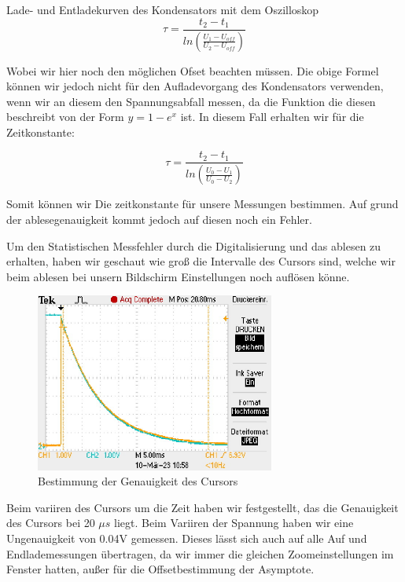 \documentclass[twoside]{protokoll}
\begin{document}
\begin{aufgabe}{Lade- und Entladekurven des Kondensators mit dem Oszilloskop}
\begin{equation}
	\tau = \frac{t_2 - t_1}{ln\left(\frac{U_1-U_{off}}{U_2-U_{off}}\right)}	
\end{equation}

Wobei wir hier noch den möglichen Ofset beachten müssen. Die obige Formel können wir jedoch nicht für den Aufladevorgang des Kondensators verwenden, wenn wir an diesem den Spannungsabfall messen, da die Funktion die diesen beschreibt von der Form $ y = 1 - e^x $ ist. 
In diesem Fall erhalten wir für die Zeitkonstante:
 
 \begin{equation}
 \tau = \frac{t_2 - t_1}{ln\left(\frac{U_0 - U_1}{U_0 - U_2}\right)}
\end{equation}

Somit können wir Die zeitkonstante für unsere Messungen bestimmen. Auf grund der ablesegenauigkeit kommt jedoch auf diesen noch ein Fehler. 

Um den Statistischen Messfehler durch die Digitalisierung und das ablesen zu erhalten, haben wir geschaut wie groß die Intervalle des Cursors sind, welche wir beim ablesen bei unsern Bildschirm Einstellungen noch auflösen könne.
 
\begin{figure}[H]
  \centering
    \includegraphics[width=0.7\textwidth]{Bilder_Osziloskop/osziloskop-test-cursor-genauigkeit.pdf}
    \caption{Bestimmung der Genauigkeit des Cursors}
  \centering
\end{figure}
Beim variiren des Cursors um die Zeit haben wir festgestellt, das die Genauigkeit des Cursors bei 20 $\mu s$ liegt.
Beim Variiren der Spannung haben wir eine Ungenauigkeit von 0.04V gemessen.
Dieses lässt sich auch auf alle Auf und Endlademessungen übertragen, da wir immer die gleichen Zoomeinstellungen im Fenster hatten, außer für die Offsetbestimmung der Asymptote. \\



\end{aufgabe}
\end{document}
